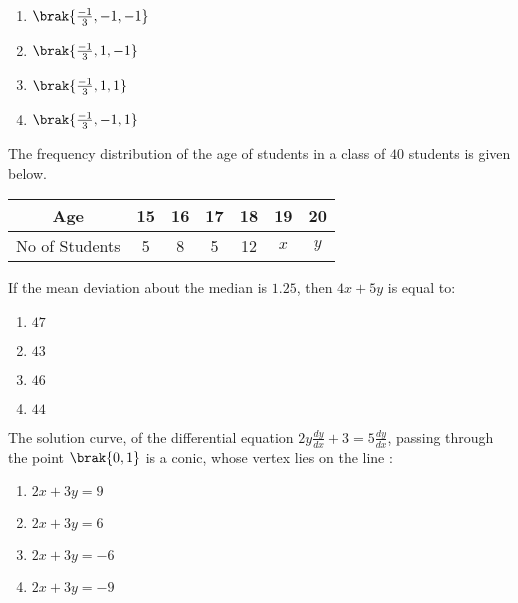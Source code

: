      \begin{enumerate}
	\item $\brak{\frac{-1}{3},-1,-1}$
	\item $\brak{\frac{-1}{3},1,-1}$
	\item $\brak{\frac{-1}{3},1,1}$ 
	\item $\brak{\frac{-1}{3},-1,1}$ 
     \end{enumerate}
\item The frequency distribution of the age of students in a class of $40$ students is given below.
	\begin{table}[h]
\centering
\begin{tabular}{|c|c|c|c|c|c|c|}
\hline
Age           & 15  & 16  & 17  & 18  & 19  & 20  \\ \hline
No of Students & 5   & 8   & 5   & 12  & $x$ & $y$ \\ \hline
\end{tabular}
\end{table}
If the mean deviation about the median is $1.25$, then $4x+5y$ is equal to: \hfill{}
     \begin{enumerate}
     \item $47$ \item $43$ \item $46$ \item $44$
     \end{enumerate}
\item The solution curve, of the differential equation $2y \frac{dy}{dx} +3=5\frac{dy}{dx}$, passing through the point $\brak{0,1}$ is a conic, whose vertex lies on the line : \hfill{}
	\begin{enumerate}
     \item $2x+3y=9$ \item $2x+3y=6$ \item $2x+3y=-6$ \item $2x+3y=-9$ 
     \end{enumerate}

 

 
